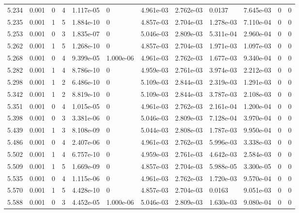 \documentclass[preview]{standalone}
\begin{document}
{{{{{{{\begin{tabular}{L{1.2cm}C{1.2cm} C{0.3cm}C{0.5cm} C{1.4cm}C{1.4cm} C{1.4cm}C{1.4cm} C{1.6cm}C{1.6cm} C{1.6cm}C{1.6cm}}
  5.234  &  0.001  & 0     &  4 &  1.117e-05  & 0  &  4.961e-03&   2.762e-03& 0.0137 & 7.645e-03   &  0 & 0  \\ 
  5.235  &  0.001  & 1     &  5 &  1.884e-10  & 0  &  4.857e-03&   2.704e-03& 1.278e-03 & 7.110e-04   &  0 & 0  \\ 
  5.253  &  0.001  & 0     &  3 &  1.835e-07  & 0  &  5.046e-03&   2.809e-03& 5.311e-04 & 2.960e-04   &  0 & 0  \\ 
  5.262  &  0.001  & 1     &  5 &  1.268e-10  & 0  &  4.857e-03&   2.704e-03& 1.971e-03 & 1.097e-03   &  0 & 0  \\ 
  5.268  &  0.001  & 0     &  4 &  9.399e-05  & 1.000e-06  &  4.961e-03&   2.762e-03& 1.677e-03 & 9.340e-04   &  0 & 0  \\ 
  5.282  &  0.001  & 1     &  4 &  8.786e-10  & 0  &  4.959e-03&   2.761e-03& 3.974e-03 & 2.212e-03   &  0 & 0  \\ 
  5.298  &  0.001  & 1     &  2 &  6.486e-10  & 0  &  5.109e-03&   2.844e-03& 2.319e-03 & 1.291e-03   &  0 & 0  \\ 
  5.342  &  0.001  & 1     &  2 &  8.819e-10  & 0  &  5.109e-03&   2.844e-03& 3.787e-03 & 2.108e-03   &  0 & 0  \\ 
  5.351  &  0.001  & 0     &  4 &  1.015e-05  & 0  &  4.961e-03&   2.762e-03& 2.161e-04 & 1.200e-04   &  0 & 0  \\ 
  5.398  &  0.001  & 0     &  3 &  3.381e-06  & 0  &  5.046e-03&   2.809e-03& 7.128e-04 & 3.970e-04   &  0 & 0  \\ 
  5.439  &  0.001  & 1     &  3 &  8.108e-09  & 0  &  5.044e-03&   2.808e-03& 1.787e-03 & 9.950e-04   &  0 & 0  \\ 
  5.486  &  0.001  & 0     &  4 &  2.407e-06  & 0  &  4.961e-03&   2.762e-03& 5.996e-03 & 3.338e-03   &  0 & 0  \\ 
  5.502  &  0.001  & 1     &  4 &  6.757e-10  & 0  &  4.959e-03&   2.761e-03& 4.642e-03 & 2.584e-03   &  0 & 0  \\ 
  5.509  &  0.001  & 1     &  5 &  1.669e-09  & 0  &  4.857e-03&   2.704e-03& 5.988e-05 & 3.300e-05   &  0 & 0  \\ 
  5.535  &  0.001  & 0     &  4 &  1.115e-06  & 0  &  4.961e-03&   2.762e-03& 1.720e-03 & 9.570e-04   &  0 & 0  \\ 
  5.570  &  0.001  & 1     &  5 &  4.428e-10  & 0  &  4.857e-03&   2.704e-03& 0.0163 & 9.051e-03   &  0 & 0  \\ 
  5.588  &  0.001  & 0     &  3 &  4.452e-05  & 1.000e-06  &  5.046e-03&   2.809e-03& 1.630e-03 & 9.080e-04   &  0 & 0  \\ 

\end{tabular}}}}}}}}
\end{document}
